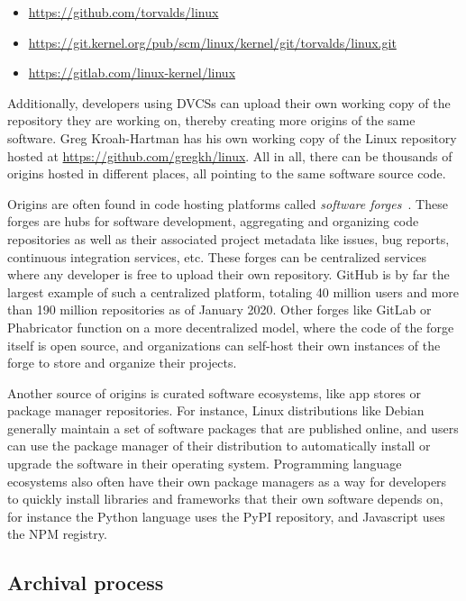 \begin{itemize}[ ]
    \setlength\itemsep{-0.5em}
    \item \url{https://github.com/torvalds/linux}
    \item \url{https://git.kernel.org/pub/scm/linux/kernel/git/torvalds/linux.git}
    \item \url{https://gitlab.com/linux-kernel/linux}
\end{itemize}

Additionally, developers using \glspl{DVCS} can upload their own working copy of
the repository they are working on, thereby creating more origins of the same
software. Greg Kroah-Hartman has his own working copy of the Linux repository
hosted at \url{https://github.com/gregkh/linux}. All in all, there can be
thousands of origins hosted in different places, all pointing to the same
software source code.

Origins are often found in code hosting platforms called \emph{software
forges}~\cite{squire2012describing}. These forges are hubs for software
development, aggregating and organizing code repositories as well as their
associated project metadata like issues, bug reports, continuous integration
services, etc.  These forges can be centralized services where any developer is
free to upload their own repository. GitHub is by far the largest example of
such a centralized platform, totaling 40 million users and more than 190
million repositories as of January 2020. Other forges like GitLab or
Phabricator function on a more decentralized model, where the code of the forge
itself is open source, and organizations can self-host their own instances of
the forge to store and organize their projects.

Another source of origins is curated software ecosystems, like app stores or
package manager repositories. For instance, Linux distributions like Debian
generally maintain a set of software packages that are published online, and
users can use the package manager of their distribution to automatically
install or upgrade the software in their operating system. Programming language
ecosystems also often have their own package managers as a way for developers
to quickly install libraries and frameworks that their own software depends on,
for instance the Python language uses the PyPI repository, and Javascript uses
the NPM registry.

\subsection{Archival process}

